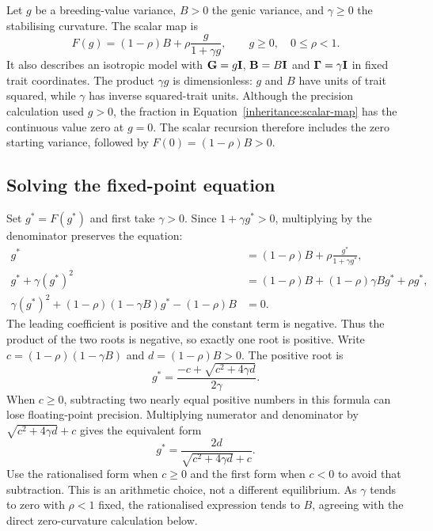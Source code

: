 Let $g$ be a breeding-value variance, $B>0$ the genic variance, and
$\gamma\geq0$ the stabilising curvature. The scalar map is
\begin{equation}
  F(g)=(1-\rho)B+\rho\frac{g}{1+\gamma g},
  \qquad g\geq0,\quad0\leq\rho<1.
  \label{inheritance:scalar-map}
\end{equation}
It also describes an isotropic model with
$\mathbf{G}=g\mathbf{I}$, $\mathbf{B}=B\mathbf{I}$ and
$\boldsymbol{\Gamma}=\gamma\mathbf{I}$ in fixed trait coordinates.
The product $\gamma g$ is dimensionless: $g$ and $B$ have units of
trait squared, while $\gamma$ has inverse squared-trait units.
Although the precision calculation used $g>0$, the fraction in
Equation~\eqref{inheritance:scalar-map} has the continuous value zero
at $g=0$. The scalar recursion therefore includes the zero starting
variance, followed by $F(0)=(1-\rho)B>0$.

\subsection{Solving the fixed-point equation}
\label{inheritance:scalar-root}

Set $g^*=F(g^*)$ and first take $\gamma>0$. Since
$1+\gamma g^*>0$, multiplying by the denominator preserves the equation:
\begin{align}
  g^*&=(1-\rho)B+\rho\frac{g^*}{1+\gamma g^*},\\
  g^*+\gamma(g^*)^2
     &=(1-\rho)B+(1-\rho)\gamma B g^*+\rho g^*,\\
  \gamma(g^*)^2+(1-\rho)(1-\gamma B)g^*-(1-\rho)B&=0.
  \label{inheritance:scalar-quadratic}
\end{align}
The leading coefficient is positive and the constant term is negative.
Thus the product of the two roots is negative, so exactly one root is
positive. Write $c=(1-\rho)(1-\gamma B)$ and
$d=(1-\rho)B>0$. The positive root is
\begin{equation}
  g^*=\frac{-c+\sqrt{c^2+4\gamma d}}{2\gamma}.
  \label{inheritance:positive-root}
\end{equation}
When $c\geq0$, subtracting two nearly equal positive numbers in this
formula can lose floating-point precision. Multiplying numerator and
denominator by $\sqrt{c^2+4\gamma d}+c$ gives the equivalent form
\begin{equation}
  g^*=\frac{2d}{\sqrt{c^2+4\gamma d}+c}.
  \label{inheritance:rationalised-root}
\end{equation}
Use the rationalised form when $c\geq0$ and the first form when $c<0$
to avoid that subtraction. This is an arithmetic choice, not a different
equilibrium. As $\gamma$ tends to zero with $\rho<1$ fixed, the
rationalised expression tends to $B$, agreeing with the direct
zero-curvature calculation below.

